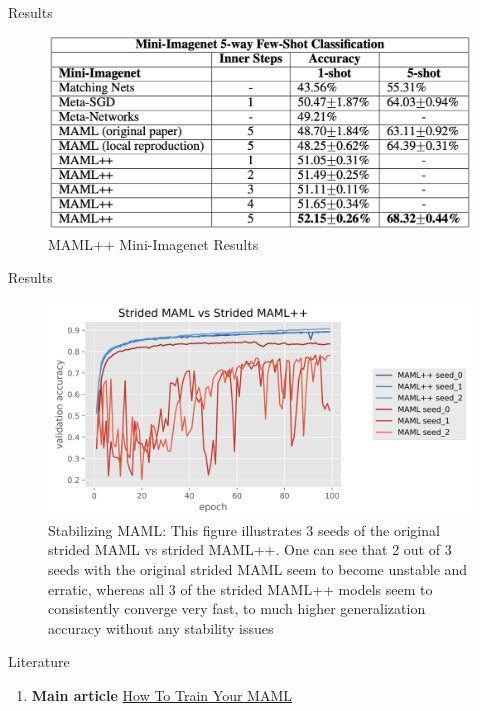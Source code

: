 \documentclass{beamer}
\begin{document}
\begin{frame}{Results}
    \begin{figure}{}
        \centering
        \includegraphics[scale=0.35]{images/table2.png}
        \caption{MAML++ Mini-Imagenet Results}
        \label{fig:enter-label}
    \end{figure}
\end{frame}

\begin{frame}{Results}
    \begin{figure}{}
        \centering
        \includegraphics[scale=0.3]{images/figure1.png}
        \caption{Stabilizing MAML: This figure illustrates 3 seeds of the original strided MAML vs strided MAML++. One can see that 2 out of 3 seeds with the original strided MAML seem to become unstable and erratic, whereas all 3 of the strided MAML++ models seem to consistently converge very fast, to much higher generalization accuracy without any stability issues}
        \label{fig:enter-label}
    \end{figure}
\end{frame}

\begin{frame}{Literature}
    \begin{enumerate}
        \item \textbf{Main article} \href{https://arxiv.org/pdf/1810.09502.pdf} 
        {How To Train Your MAML}
    \end{enumerate}
\end{frame}
\end{document}
